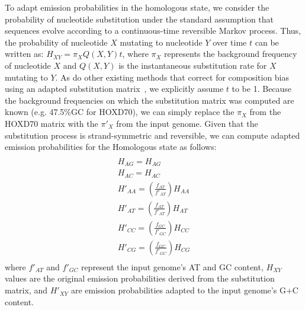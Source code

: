 To adapt emission probabilities in the homologous state, we consider the
probability of nucleotide substitution under the standard assumption
that sequences evolve according to a continuous-time reversible Markov process.
Thus, the probability of nucleotide $X$ mutating to nucleotide $Y$ over time $t$
can be written as: $H_{XY}=\pi_X Q(X,Y)t$, where $\pi_X$ represents the background
frequency of nucleotide $X$ and $Q(X,Y)$ is the instantaneous substitution rate for $X$
mutating to $Y$. As do other existing methods that correct for composition bias using an adapted substitution matrix~\cite{repseek}, we explicitly assume $t$ to be 1.  Because the background frequencies on which the substitution matrix was computed are
known (e.g. 47.5\%GC for HOXD70), we can simply replace the $\pi_X$ from the HOXD70 matrix
with the $\pi'_X$ from the input genome. Given that the substitution process is
strand-symmetric and reversible, we can compute adapted
emission probabilities for the Homologous state as follows:
\begin{multline}\\
H_{AG}=H_{AG}\\
H_{AC}=H_{AC}\\
H'_{AA}=(\frac{f_{AT}}{f'_{AT}})H_{AA}\\
H'_{AT}=(\frac{f_{AT}}{f'_{AT}})H_{AT}\\
H'_{CC}=(\frac{f_{GC}}{f'_{GC}})H_{CC}\\
H'_{CG}=(\frac{f_{GC}}{f'_{GC}})H_{CG}\\
\end{multline}
where $f'_{AT}$ and $f'_{GC}$ represent the input genome's AT and GC content,
$H_{XY}$ values are the original emission probabilities derived from the
substitution matrix, and $H'_{XY}$ are emission probabilities adapted to
the input genome's G+C content.


